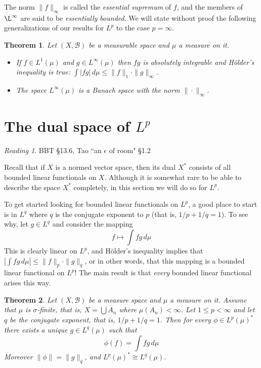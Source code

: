 \documentclass[11pt,oneside]{amsbook}
\theoremstyle{definition}
\theoremstyle{plain}
\newtheorem{thm}{Theorem}[section]
\theoremstyle{definition}
\theoremstyle{remark}
\newtheorem*{reading}{Reading}
\numberwithin{equation}{section}
\numberwithin{figure}{section}
\begin{document}
The norm $\|f\|_\infty$ is called the \emph{essential supremum} of $f$, and the members of $\L^\infty$ are said to be \emph{essentially bounded}. We will state without proof the following generalizations of our results for $L^p$ to the case $p=\infty$.

\begin{thm}
  Let $(X,\mathcal B)$ be a measurable space and $\mu$ a measure on it.
  \begin{itemize}
  \item If $f\in L^1(\mu)$ and $g\in L^\infty(\mu)$ then $fg$ is absolutely integrable and H\"older's inequality is true: $\int|fg|\,d\mu\leq\|f\|_1\cdot\|g\|_\infty$.
  \item The space $L^\infty(\mu)$ is a Banach space with the norm $\|\cdot\|_\infty$.
  \end{itemize}
\end{thm}

\newpage
\section{The dual space of $L^p$}

\begin{reading}
  BBT \S 13.6, Tao ``an $\epsilon$ of room" \S 1.2
\end{reading}

Recall that if $X$ is a normed vector space, then its dual $X^*$ consists of all bounded linear functionals on $X$. Although it is somewhat rare to be able to describe the space $X^*$ completely, in this section we will do so for $L^p$.

To get started looking for bounded linear functionals on $L^p$, a good place to start is in $L^q$ where $q$ is the conjugate exponent to $p$ (that is, $1/p+1/q=1$). To see why, let $g\in L^q$ and consider the mapping
\[f\mapsto \int fg\,d\mu
\]
This is clearly linear on $L^p$, and H\"older's inequality implies that $\left|\int fg\,d\mu\right|\leq\|f\|_p\cdot\|g\|_q$, or in other words, that this mapping is a bounded linear functional on $L^p$! The main result is that \emph{every} bounded linear functional arises this way.

\begin{thm}
  \label{thm:lpdual}
  Let $(X,\mathcal B)$ be a measure space and $\mu$ a measure on it. Assume that $\mu$ is $\sigma$-finite, that is, $X=\bigcup A_n$ where $\mu(A_n)<\infty$. Let $1\leq p<\infty$ and let $q$ be the conjugate exponent, that is, $1/p+1/q=1$. Then for every $\phi\in L^p(\mu)^*$ there exists a unique $g\in L^q(\mu)$ such that
  \[\phi(f)=\int fg\,d\mu
  \]
  Moreover $\|\phi\|=\|g\|_q$, and $L^p(\mu)^*\cong L^q(\mu)$.
\end{thm}
\end{document}
